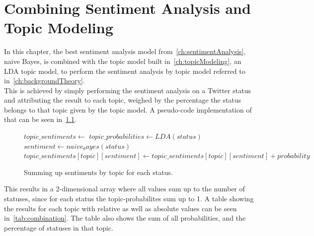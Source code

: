\chapter{Combining Sentiment Analysis and Topic Modeling}
\label{ch:combiningSentimentAnalysisAndTopicModeling}


In this chapter, the best sentiment analysis model from~\ref{ch:sentimentAnalysis}, naive Bayes,
is combined with the topic model built in~\ref{ch:topicModeling}, an LDA topic model,
to perform the sentiment analysis by topic model referred to in~\ref{ch:backgroundTheory}.
\\
This is achieved by simply performing the sentiment analysis on a Twitter status and attributing the result to each topic,
weighed by the percentage the status belongs to that topic given by the topic model.
A pseudo-code implementation of that can be seen in~\ref{pseudo_code:sentiment_topic_summing}.

\begin{figure}
    \caption{Summing up sentiments by topic for each status.}
    \label{pseudo_code:sentiment_topic_summing}
    \begin{algorithmic}
        \State $topic\_sentiments \gets {}$ %
            \State $topic\_probabilities \gets LDA(status)$
            \State $sentiment \gets naive_bayes(status)$
                \State $topic\_sentiments[topic][sentiment] \gets topic\_sentiments[topic][sentiment] + probability$
    \end{algorithmic}
\end{figure}

This results in a 2-dimensional array where all values sum up to the number of statuses,
since for each status the topic-probabilites sum up to 1.
A table showing the results for each topic with relative as well as absolute values can be seen in~\ref{tab:combination}.
The table also shows the sum of all probabilities, and the percentage of statuses in that topic.

